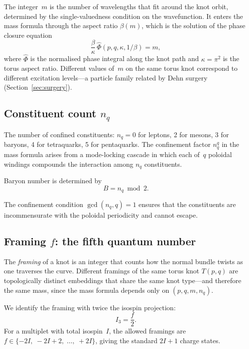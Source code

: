 \documentclass[11pt,a4paper]{article}
\begin{document}
The integer~$m$ is the number of wavelengths that fit around
the knot orbit, determined by the single-valuedness condition
on the wavefunction.  It enters the mass formula through the
aspect ratio $\beta(m)$, which is the solution of the phase
closure equation
\begin{equation}
  \frac{\beta}{\kappa}\,\hat{\Phi}(p,q,\kappa,1/\beta) = m,
  \label{eq:phase}
\end{equation}
where $\hat{\Phi}$ is the normalised phase integral along the
knot path and $\kappa = \pi^2$ is the torus aspect ratio.
Different values of~$m$ on the same torus knot correspond to
different excitation levels---a particle family related by
Dehn surgery (Section~\ref{sec:surgery}).

\subsection{Constituent count $n_q$}

The number of confined constituents: $n_q = 0$ for leptons,
2 for mesons, 3 for baryons, 4 for tetraquarks, 5 for
pentaquarks.  The confinement factor $n_q^q$ in the mass
formula arises from a mode-locking cascade in which each
of~$q$ poloidal windings compounds the interaction among
$n_q$ constituents.

Baryon number is determined by
\begin{equation}
  B = n_q \bmod 2.
  \label{eq:baryon}
\end{equation}

The confinement condition $\gcd(n_q, q) = 1$ ensures that
the constituents are incommensurate with the poloidal
periodicity and cannot escape.

\subsection{Framing $f$: the fifth quantum number}
\label{sec:framing}

The \emph{framing} of a knot is an integer that counts how
the normal bundle twists as one traverses the curve.
Different framings of the same torus knot $T(p,q)$ are
topologically distinct embeddings that share the same knot
type---and therefore the same mass, since the mass formula
depends only on $(p,q,m,n_q)$.

We identify the framing with twice the isospin projection:
\begin{equation}
  I_3 = \frac{f}{2}.
  \label{eq:isospin}
\end{equation}
For a multiplet with total isospin~$I$, the allowed framings
are $f \in \{-2I,\; -2I+2,\; \ldots,\; +2I\}$, giving the
standard $2I+1$ charge states.
\end{document}
